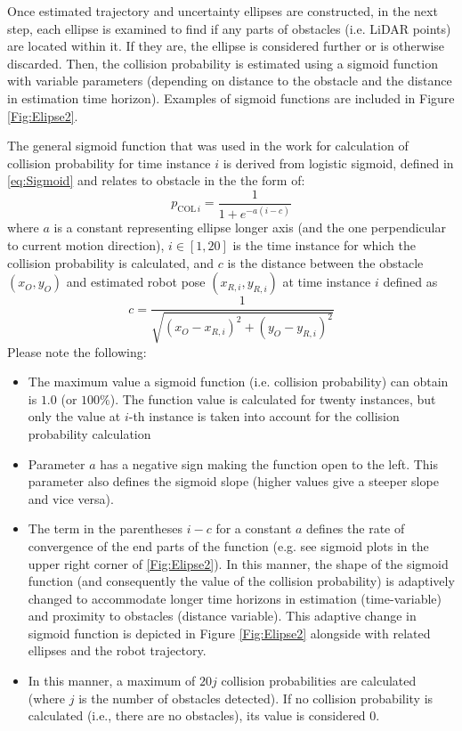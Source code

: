 Once estimated trajectory and uncertainty ellipses are constructed, in the next step, each ellipse is examined to find if any parts of obstacles (i.e. LiDAR points) are located within it. If they are, the ellipse is considered further or is otherwise discarded. Then, the collision probability is estimated using a sigmoid function with variable parameters (depending on distance to the obstacle and the distance in estimation time horizon). Examples of sigmoid functions are included in Figure \ref{Fig:Elipse2}. 

The general sigmoid function that was used in the work for calculation of collision probability for time instance $i$ is derived from logistic sigmoid, defined in \cref{eq:Sigmoid} and relates to obstacle in the the form of:
\begin{equation}
    p_{\textrm{COL}\,i} = \frac{1}{1+e^{-a(i-c)}}
    \label{eq:CollisionProbability}
\end{equation}
where $a$ is a constant representing ellipse longer axis (and the one perpendicular to current motion direction), $i\in[1,20]$ is the time instance for which the collision probability is calculated, and $c$ is the distance between the obstacle $(x_O,y_O)$ and estimated robot pose $(x_{R,i},y_{R,i})$ at time instance $i$ defined as
\[
    c=\frac{1}{\sqrt{(x_O-x_{R,i})^2+(y_O-y_{R,i})^2}}
\]
Please note the following:

\begin{itemize}
    \item The maximum value a sigmoid function (i.e. collision probability) can obtain is $1.0$ (or $100\%$). The function value is calculated for twenty instances, but only the value at $i$-th instance is taken into account for the collision probability calculation
    \item Parameter $a$ has a negative sign making the function open to the left. This parameter also defines the sigmoid slope (higher values give a steeper slope and vice versa).
    \item The term in the parentheses $i-c$ for a constant $a$ defines the rate of convergence of the end parts of the function (e.g. see sigmoid plots in the upper right corner of \cref{Fig:Elipse2}). In this manner, the shape of the sigmoid function (and consequently the value of the collision probability) is adaptively changed to accommodate longer time horizons in estimation (time-variable) and proximity to obstacles (distance variable). This adaptive change in sigmoid function is depicted in Figure \ref{Fig:Elipse2} alongside with related ellipses and the robot trajectory.
    \item In this manner, a maximum of $20j$ collision probabilities are calculated (where $j$ is the number of obstacles detected). If no collision probability is calculated (i.e., there are no obstacles), its value is considered 0.
\end{itemize}

